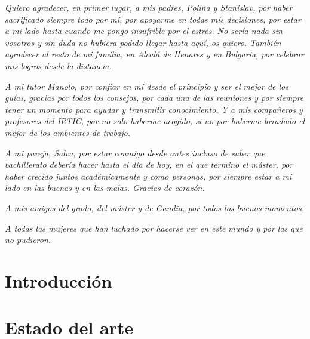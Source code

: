 \documentclass[twoside,spanish,a4paper,12pt]{tfg}
\begin{document}
\begin{agradecimientos}
\setlength{\parskip}{8pt plus 2pt minus 1pt}
\textit{Quiero agradecer, en primer lugar, a mis padres, Polina y Stanislav, por haber sacrificado siempre todo por mí, por apoyarme en todas mis decisiones, por estar a mi lado hasta cuando me pongo insufrible por el estrés. No sería nada sin vosotros y sin duda no hubiera podido llegar hasta aquí, os quiero. También agradecer al resto de mi familia, en Alcalá de Henares y en Bulgaria, por celebrar mis logros desde la distancia.}

\textit{A mi tutor Manolo, por confiar en mí desde el principio y ser el mejor de los guías, gracias por todos los consejos, por cada una de las reuniones y por siempre tener un momento para ayudar y transmitir conocimiento. Y a mis compañeros y profesores del IRTIC, por no solo haberme acogido, si no por haberme brindado el mejor de los ambientes de trabajo.}

\textit{A mi pareja, Salva, por estar conmigo desde antes incluso de saber que bachillerato debería hacer hasta el día de hoy, en el que termino el máster, por haber crecido juntos académicamente y como personas, por siempre estar a mi lado en las buenas y en las malas. Gracias de corazón.}

\textit{A mis amigos del grado, del máster y de Gandia, por todos los buenos momentos.}

\textit{A todas las mujeres que han luchado por hacerse ver en este mundo y por las que no pudieron.}
\end{agradecimientos}
\cleardoublepage

\tableofcontents

\pagestyle{tfg}
\justify

\listoffigures

\cleardoublepage

\listoftables

\cleardoublepage


\chapter{Introducción}


\chapter{Estado del arte}

\end{document}
